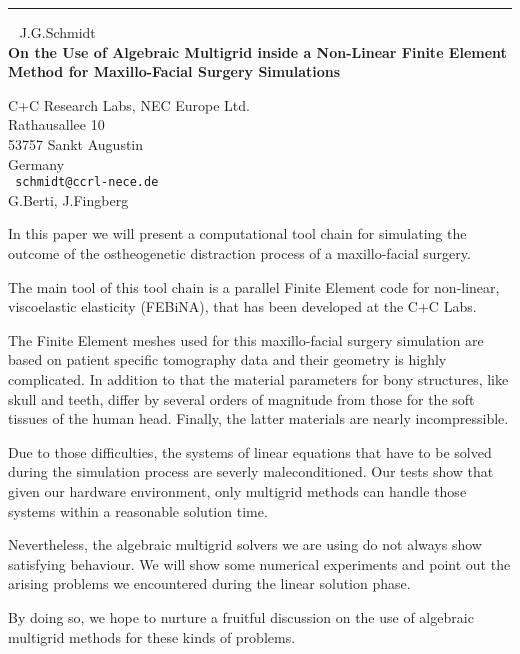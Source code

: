 \documentclass{report}
\begin{document}
\begin{center}

\rule{6in}{1pt} \
{\large
J.G.Schmidt
\\ {\bf
On the Use of Algebraic Multigrid inside a Non-Linear Finite Element
Method for Maxillo-Facial Surgery Simulations
}}

C+C Research Labs, NEC Europe Ltd. \\
Rathausallee 10 \\
53757 Sankt Augustin \\
Germany 
\\ {\tt
schmidt@ccrl-nece.de
}
\\
G.Berti,
J.Fingberg 
\end{center}



In this paper we will present a computational tool chain for simulating
the outcome of the ostheogenetic distraction process of a
maxillo-facial surgery.

The main tool of this tool chain is a parallel Finite Element code for
non-linear, viscoelastic elasticity (FEBiNA), that has been developed
at the C+C Labs.

The Finite Element meshes used for this maxillo-facial surgery
simulation are based on patient specific tomography data and their
geometry is highly complicated. In addition to that the material
parameters for bony structures, like skull and teeth, differ by several
orders of magnitude from those for the soft tissues of the human head.
Finally, the latter materials are nearly incompressible.

Due to those difficulties, the systems of linear equations that have to
be solved during the simulation process are severly maleconditioned.
Our tests show that given our hardware environment, only multigrid
methods can handle those systems within a reasonable solution time.

Nevertheless, the algebraic multigrid solvers we are using do not
always show satisfying behaviour. We will show some numerical
experiments and point out the arising problems we encountered during
the linear solution phase.

By doing so, we hope to nurture a fruitful discussion on the use of
algebraic multigrid methods for these kinds of problems. 
\end{document}
